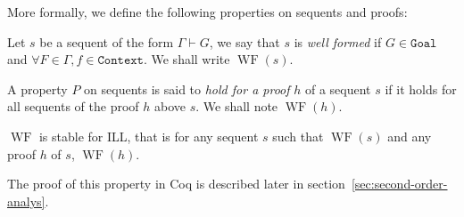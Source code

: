 \documentclass[runningheads,a4paper]{llncs}
\DeclareMathOperator{\wf}{WF}
\begin{document}
More formally, we define the following properties on sequents and
proofs:
\begin{definition}
  Let $s$ be a sequent of the form $\Gamma\vdash G$, we say that $s$
  is \emph{well formed} if $G\in\texttt{Goal}$ and $\forall
  F\in\Gamma, f \in \texttt{Context}$. We shall write $\wf(s)$.
\end{definition}
\begin{definition}
  A property $P$ on sequents is said to \emph{hold for a proof} $h$ of
  a sequent $s$ if it holds for all sequents of the proof $h$ above
  $s$. We shall note $\wf(h)$.
\end{definition}
\begin{definition}\label{def:stab}
  $\wf$ is stable for ILL, that is for any sequent $s$ such that
  $\wf(s)$ and any proof $h$ of $s$, $\wf(h)$.
\end{definition}
The proof of this property in Coq is described later in section~\ref{sec:second-order-analys}.
%
\end{document}
